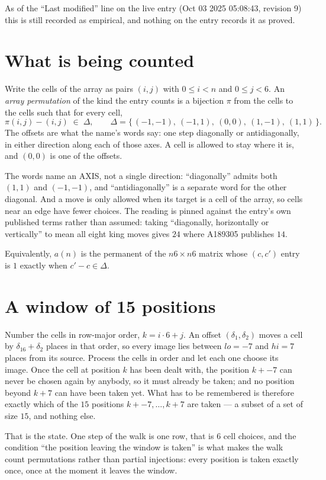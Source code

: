 \documentclass[11pt,a4paper]{article}
\theoremstyle{plain}
\theoremstyle{definition}
\begin{document}
As of the ``Last modified'' line on the live entry (Oct 03 2025 05:08:43, revision 9) this is still
recorded as empirical, and nothing on the entry records it as proved.

\section{What is being counted}

Write the cells of the array as pairs $(i,j)$ with $0\le i<n$ and $0\le j<6$. An
\emph{array permutation} of the kind the entry counts is a bijection $\pi$ from the cells to
the cells such that for every cell,
\[
\pi(i,j)-(i,j)\;\in\;\Delta,\qquad
\Delta=\{\,(-1,-1),\ (-1,1),\ (0,0),\ (1,-1),\ (1,1)\,\}.
\]
The offsets are what the name's words say: one step diagonally or antidiagonally, in either direction along each of those axes. A cell is allowed to stay where it is, and $(0,0)$ is one of the offsets.

The words name an AXIS, not a single direction: ``diagonally'' admits
both $(1,1)$ and $(-1,-1)$, and ``antidiagonally'' is a separate word for the other diagonal.
And a move is only allowed when its target is a cell of the array, so cells near an
edge have fewer choices. The reading is pinned against the entry's own published terms rather
than assumed: taking ``diagonally, horizontally or vertically'' to mean all eight king moves
gives $24$ where A189305 publishes $14$.

Equivalently, $a(n)$ is the permanent of the $n6\times n6$ matrix whose $(c,c')$ entry is
$1$ exactly when $c'-c\in\Delta$.

\section{A window of 15 positions}

Number the cells in row-major order, $k=i\cdot6+j$. An offset $(\delta_1,\delta_2)$ moves a
cell by $\delta_16+\delta_2$ places in that order, so every image lies between $lo=-7$ and
$hi=7$ places from its source. Process the cells in order and let each one choose its image.
Once the cell at position $k$ has been dealt with, the position $k+-7$ can never be chosen
again by anybody, so it must already be taken; and no position beyond $k+7$ can have been
taken yet. What has to be remembered is therefore exactly which of the $15$ positions
$k+-7,\dots,k+7$ are taken --- a subset of a set of size $15$, and nothing else.

That is the state. One step of the walk is one row, that is $6$ cell choices, and the
condition ``the position leaving the window is taken'' is what makes the walk count permutations
rather than partial injections: every position is taken exactly once, once at the moment it
leaves the window.
\end{document}
